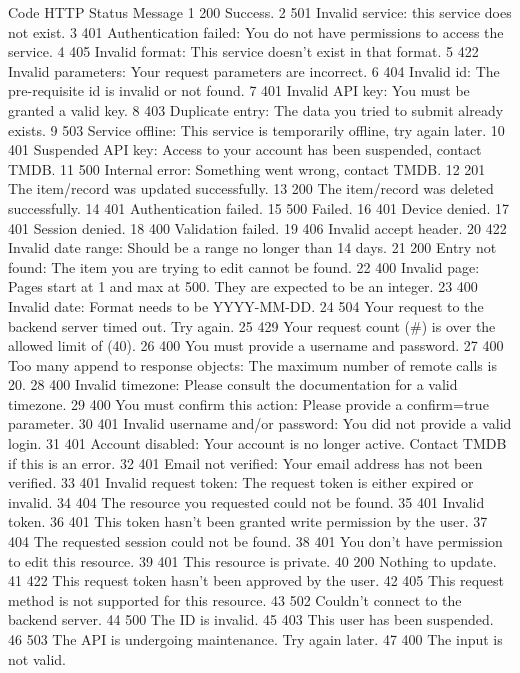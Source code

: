 Code	HTTP Status	Message
1	200	Success.
2	501	Invalid service: this service does not exist.
3	401	Authentication failed: You do not have permissions to access the service.
4	405	Invalid format: This service doesn't exist in that format.
5	422	Invalid parameters: Your request parameters are incorrect.
6	404	Invalid id: The pre-requisite id is invalid or not found.
7	401	Invalid API key: You must be granted a valid key.
8	403	Duplicate entry: The data you tried to submit already exists.
9	503	Service offline: This service is temporarily offline, try again later.
10	401	Suspended API key: Access to your account has been suspended, contact TMDB.
11	500	Internal error: Something went wrong, contact TMDB.
12	201	The item/record was updated successfully.
13	200	The item/record was deleted successfully.
14	401	Authentication failed.
15	500	Failed.
16	401	Device denied.
17	401	Session denied.
18	400	Validation failed.
19	406	Invalid accept header.
20	422	Invalid date range: Should be a range no longer than 14 days.
21	200	Entry not found: The item you are trying to edit cannot be found.
22	400	Invalid page: Pages start at 1 and max at 500. They are expected to be an integer.
23	400	Invalid date: Format needs to be YYYY-MM-DD.
24	504	Your request to the backend server timed out. Try again.
25	429	Your request count (#) is over the allowed limit of (40).
26	400	You must provide a username and password.
27	400	Too many append to response objects: The maximum number of remote calls is 20.
28	400	Invalid timezone: Please consult the documentation for a valid timezone.
29	400	You must confirm this action: Please provide a confirm=true parameter.
30	401	Invalid username and/or password: You did not provide a valid login.
31	401	Account disabled: Your account is no longer active. Contact TMDB if this is an error.
32	401	Email not verified: Your email address has not been verified.
33	401	Invalid request token: The request token is either expired or invalid.
34	404	The resource you requested could not be found.
35	401	Invalid token.
36	401	This token hasn't been granted write permission by the user.
37	404	The requested session could not be found.
38	401	You don't have permission to edit this resource.
39	401	This resource is private.
40	200	Nothing to update.
41	422	This request token hasn't been approved by the user.
42	405	This request method is not supported for this resource.
43	502	Couldn't connect to the backend server.
44	500	The ID is invalid.
45	403	This user has been suspended.
46	503	The API is undergoing maintenance. Try again later.
47	400	The input is not valid.